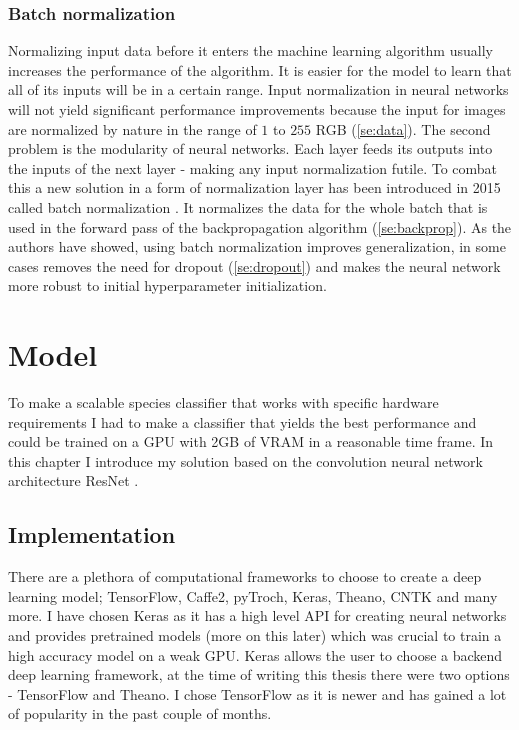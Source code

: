 \documentclass[times, utf8, diplomski]{fer}
\begin{document}
\subsection{Batch normalization}
\label{se:batch_norm}

Normalizing input data before it enters the machine learning algorithm usually increases the performance of the algorithm. It is easier for the model to learn that all of its inputs will be in a certain range. Input normalization in neural networks will not yield significant performance improvements because the input for images are normalized by nature in the range of $1$ to $255$ RGB (\ref{se:data}). The second problem is the modularity of neural networks. Each layer feeds its outputs into the inputs of the next layer - making any input normalization futile. To combat this a new solution in a form of normalization layer has been introduced in 2015 called batch normalization \citep{ioffe_batch_2015}. It normalizes the data for the whole batch that is used in the forward pass of the backpropagation algorithm (\ref{se:backprop}). As the authors have showed, using batch normalization improves generalization, in some cases removes the need for dropout (\ref{se:dropout}) and makes the neural network more robust to initial hyperparameter initialization.

\chapter{Model}
To make a scalable species classifier that works with specific hardware requirements I had to make a classifier that yields the best performance and could be trained on a GPU with 2GB of VRAM in a reasonable time frame. In this chapter I introduce my solution based on the convolution neural network architecture ResNet \citep{he_deep_2016}.


\section{Implementation}

There are a plethora of computational  frameworks to choose to create a deep learning model; TensorFlow, Caffe2, pyTroch, Keras, Theano, CNTK and many more. I have chosen Keras as it has a high level API for creating neural networks and provides pretrained models (more on this later) which was crucial to train a high accuracy model on a weak GPU. Keras allows the user to choose a backend deep learning framework, at the time of writing this thesis there were two options - TensorFlow and Theano. I chose TensorFlow as it is newer and has gained a lot of popularity in the past couple of months.
\end{document}
